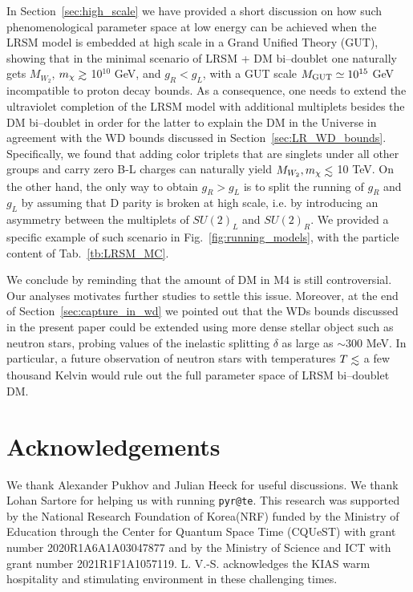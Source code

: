 \documentclass[11pt]{article}
\newcommand{\lsim}{\mathrel{\mathop{\kern 0pt \rlap
      {\raise.2ex\hbox{$<$}}}\lower.9ex\hbox{\kern-.190em $ \sim$}}}
\newcommand{\gsim}{\mathrel{\mathop{\kern 0pt
      \rlap{\raise.2ex\hbox{$>$}}}\lower.9ex\hbox{\kern-.190em $\sim$}}}
\begin{document}
 In Section~\ref{sec:high_scale} we have provided a short discussion on how such phenomenological parameter space at low energy can be achieved when the LRSM model is embedded at high scale in a Grand Unified Theory (GUT), showing that in the minimal scenario of LRSM + DM bi--doublet one naturally gets $M_{W_2}$, $m_\chi\gsim$ 10$^{10}$ GeV, and $g_R<g_L$, with a GUT scale $M_{\rm GUT}\simeq 10^{15}$ GeV incompatible to proton decay bounds. As a consequence,  one needs to extend the ultraviolet completion of the LRSM model with additional multiplets besides the DM bi--doublet in order for the latter to explain the DM in the Universe in agreement with the WD bounds discussed in Section~\ref{sec:LR_WD_bounds}. Specifically, we found that adding color triplets that are singlets under all other groups and carry zero B-L charges can naturally yield $M_{W_2}, m_\chi\lsim$ 10 TeV. On the other hand, the only way to obtain $g_R>g_L$ is to split the running of $g_R$ and $g_L$ by assuming that D parity is broken at high scale, i.e. by introducing an asymmetry between the multiplets of $SU(2)_L$ and $SU(2)_R$. We provided a specific example of such scenario in Fig.~\ref{fig:running_models}, with the particle content of Tab.~\ref{tb:LRSM_MC}.

We conclude by reminding that the amount of DM in M4 is still controversial. Our analyses motivates further studies to settle this issue. Moreover, at the end of Section~\ref{sec:capture_in_wd} we pointed out that the WDs bounds discussed in the present paper could be extended using more dense stellar object such as neutron stars, probing values of the inelastic splitting $\delta$ as large as $\sim 300$ MeV. In particular, a future observation of neutron stars with temperatures $T\lsim$ a few thousand Kelvin would rule out the full parameter space of LRSM bi--doublet DM.

\section*{Acknowledgements}
We thank Alexander Pukhov and Julian Heeck for useful discussions. 
We thank Lohan Sartore for helping us with running \verb|pyr@te|. 
This research was supported by the National Research Foundation of Korea(NRF) funded by the Ministry of Education through the Center for Quantum Space Time (CQUeST) with grant number 2020R1A6A1A03047877 and by the Ministry of Science and ICT with grant number 2021R1F1A1057119.  L. V.-S. acknowledges the KIAS  warm hospitality and stimulating environment in these challenging times.
\end{document}
